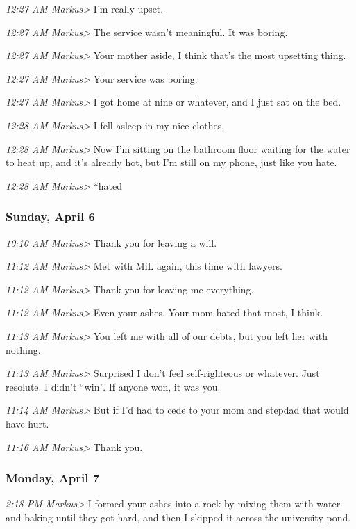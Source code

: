 {\emph{12:27 AM Markus\textgreater{}} I'm really upset.

\emph{12:27 AM Markus\textgreater{}} The service wasn't meaningful. It
was boring.

\emph{12:27 AM Markus\textgreater{}} Your mother aside, I think that's
the most upsetting thing.

\emph{12:27 AM Markus\textgreater{}} Your service was boring.

\emph{12:27 AM Markus\textgreater{}} I got home at nine or whatever, and
I just sat on the bed.

\emph{12:28 AM Markus\textgreater{}} I fell asleep in my nice clothes.

\emph{12:28 AM Markus\textgreater{}} Now I'm sitting on the bathroom
floor waiting for the water to heat up, and it's already hot, but I'm
still on my phone, just like you hate.

\emph{12:28 AM Markus\textgreater{}} *hated

\subsubsection*{Sunday, April 6}\label{sunday-april-6}

\emph{10:10 AM Markus\textgreater{}} Thank you for leaving a will.

\emph{11:12 AM Markus\textgreater{}} Met with MiL again, this time with
lawyers.

\emph{11:12 AM Markus\textgreater{}} Thank you for leaving me
everything.

\emph{11:12 AM Markus\textgreater{}} Even your ashes. Your mom hated
that most, I think.

\emph{11:13 AM Markus\textgreater{}} You left me with all of our debts,
but you left her with nothing.

\emph{11:13 AM Markus\textgreater{}} Surprised I don't feel
self-righteous or whatever. Just resolute. I didn't ``win''. If anyone
won, it was you.

\emph{11:14 AM Markus\textgreater{}} But if I'd had to cede to your mom
and stepdad that would have hurt.

\emph{11:16 AM Markus\textgreater{}} Thank you.

\subsubsection*{Monday, April 7}\label{monday-april-7}

\emph{2:18 PM Markus\textgreater{}} I formed your ashes into a rock by
mixing them with water and baking until they got hard, and then I
skipped it across the university pond.

}
